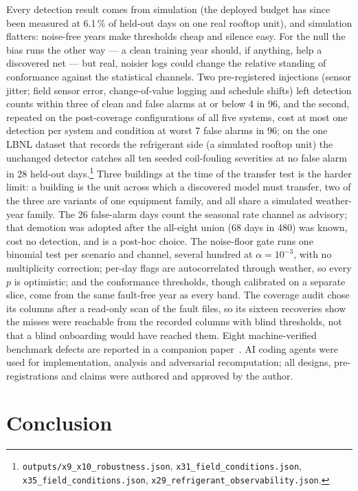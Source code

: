 \documentclass[runningheads]{llncs}
\begin{document}
Every detection result comes from simulation (the deployed budget has since been measured at 6.1\,\% of held-out days on one real rooftop unit), and simulation flatters: noise-free years make thresholds cheap and silence easy. For the null the bias runs the other way --- a clean training year should, if anything, help a discovered net --- but real, noisier logs could change the relative standing of conformance against the statistical channels. Two pre-registered injections (sensor jitter; field sensor error, change-of-value logging and schedule shifts) left detection counts within three of clean and false alarms at or below 4 in 96, and the second, repeated on the post-coverage configurations of all five systems, cost at most one detection per system and condition at worst 7 false alarms in 96; on the one LBNL dataset that records the refrigerant side (a simulated rooftop unit) the unchanged detector catches all ten seeded coil-fouling severities at no false alarm in 28 held-out days.\footnote{\texttt{outputs/x9\_x10\_robustness.json}, \texttt{x31\_field\_conditions.json}, \texttt{x35\_field\_conditions.json}, \texttt{x29\_refrigerant\_observability.json}.} Three buildings at the time of the transfer test is the harder limit: a building is the unit across which a discovered model must transfer, two of the three are variants of one equipment family, and all share a simulated weather-year family. The 26 false-alarm days count the seasonal rate channel as advisory; that demotion was adopted after the all-eight union (68 days in 480) was known, cost no detection, and is a post-hoc choice. The noise-floor gate runs one binomial test per scenario and channel, several hundred at $\alpha = 10^{-3}$, with no multiplicity correction; per-day flags are autocorrelated through weather, so every $p$ is optimistic; and the conformance thresholds, though calibrated on a separate slice, come from the same fault-free year as every band. The coverage audit chose its columns after a read-only scan of the fault files, so its sixteen recoveries show the misses were reachable from the recorded columns with blind thresholds, not that a blind onboarding would have reached them. Eight machine-verified benchmark defects are reported in a companion paper~\cite{singh2027erratacompanion}. AI coding agents were used for implementation, analysis and adversarial recomputation; all designs, pre-registrations and claims were authored and approved by the author.

\section{Conclusion}
\label{sec:conclusion}
\end{document}
